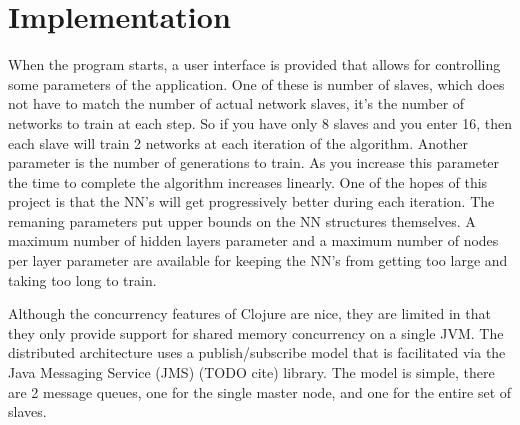 \section{Implementation}
When the program starts, a user interface is provided that allows for controlling some parameters of the application. One of these is number of slaves, which does not have to match the number of actual network slaves, it's the number of networks to train at each step. So if you have only 8 slaves and you enter 16, then each slave will train 2 networks at each iteration of the algorithm. Another parameter is the number of generations to train. As you increase this parameter the time to complete the algorithm increases linearly. One of the hopes of this project is that the NN's will get progressively better during each iteration. The remaning parameters put upper bounds on the NN structures themselves. A maximum number of hidden layers parameter and a maximum number of nodes per layer parameter are available for keeping the NN's from getting too large and taking too long to train.


Although the concurrency features of Clojure are nice, they are limited in that they only provide support for shared memory concurrency on a single JVM.  The distributed architecture uses a publish/subscribe model that is facilitated via the Java Messaging Service (JMS)  (TODO cite) library. The model is simple, there are 2 message queues, one for the single master node, and one for the entire set of slaves. 
